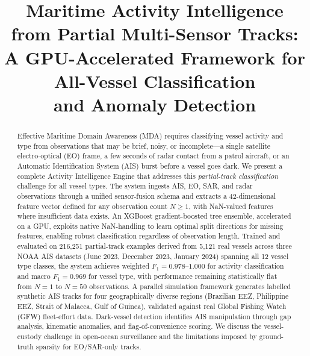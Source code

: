 \documentclass[journal]{IEEEtran}
\begin{document}
\title{Maritime Activity Intelligence from Partial Multi-Sensor Tracks:\\
A GPU-Accelerated Framework for All-Vessel Classification\\
and Anomaly Detection}

\author{%
}

\maketitle

\begin{abstract}
Effective Maritime Domain Awareness (MDA) requires classifying vessel activity
and type from observations that may be brief, noisy, or incomplete—a single
satellite electro-optical (EO) frame, a few seconds of radar contact from a
patrol aircraft, or an Automatic Identification System (AIS) burst before a
vessel goes dark.
%
We present a complete Activity Intelligence Engine that addresses this
\emph{partial-track classification} challenge for all vessel types.
%
The system ingests AIS, EO, SAR, and radar observations through a unified
sensor-fusion schema and extracts a 42-dimensional feature vector defined for
any observation count $N \geq 1$, with NaN-valued features where insufficient
data exists.
%
An XGBoost gradient-boosted tree ensemble, accelerated on a GPU, exploits
native NaN-handling to learn optimal split directions for missing features,
enabling robust classification regardless of observation length.
%
Trained and evaluated on 216,251 partial-track examples derived from
5,121 real vessels across three NOAA AIS datasets (June 2023, December 2023,
January 2024) spanning all 12 vessel type classes, the system achieves
weighted $F_1 = 0.978$--$1.000$ for activity classification and macro
$F_1 = 0.969$ for vessel type, with performance remaining statistically flat
from $N=1$ to $N=50$ observations.
%
A parallel simulation framework generates labelled synthetic AIS tracks for
four geographically diverse regions (Brazilian EEZ, Philippine EEZ, Strait of
Malacca, Gulf of Guinea), validated against real Global Fishing Watch (GFW)
fleet-effort data.
%
Dark-vessel detection identifies AIS manipulation through gap analysis,
kinematic anomalies, and flag-of-convenience scoring.
%
We discuss the vessel-custody challenge in open-ocean surveillance and the
limitations imposed by ground-truth sparsity for EO/SAR-only tracks.
\end{abstract}
\end{document}
